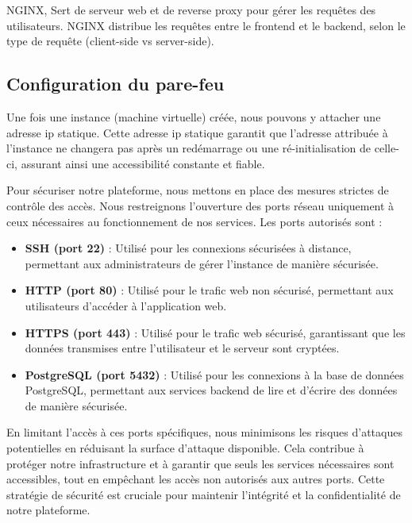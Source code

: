 NGINX, Sert de serveur web et de reverse proxy pour gérer les requêtes des utilisateurs. NGINX distribue les requêtes entre le frontend et le backend, selon le type de requête (client-side vs server-side).

\subsection{Configuration du pare-feu}

Une fois une instance (machine virtuelle) créée, nous pouvons y attacher une adresse \ac{ip} statique. Cette adresse \ac{ip} statique garantit que l'adresse attribuée à l'instance ne changera pas après un redémarrage ou une ré-initialisation de celle-ci, assurant ainsi une accessibilité constante et fiable.

Pour sécuriser notre plateforme, nous mettons en place des mesures strictes de contrôle des accès. Nous restreignons l'ouverture des ports réseau uniquement à ceux nécessaires au fonctionnement de nos services. Les ports autorisés sont :

\begin{itemize}
    \item \textbf{SSH (port 22)} : Utilisé pour les connexions sécurisées à distance, permettant aux administrateurs de gérer l'instance de manière sécurisée.
    
    \item \textbf{HTTP (port 80)} : Utilisé pour le trafic web non sécurisé, permettant aux utilisateurs d'accéder à l'application web.
    
    \item \textbf{HTTPS (port 443)} : Utilisé pour le trafic web sécurisé, garantissant que les données transmises entre l'utilisateur et le serveur sont cryptées.
    
    \item \textbf{PostgreSQL (port 5432)} : Utilisé pour les connexions à la base de données PostgreSQL, permettant aux services backend de lire et d'écrire des données de manière sécurisée.
\end{itemize}

En limitant l'accès à ces ports spécifiques, nous minimisons les risques d'attaques potentielles en réduisant la surface d'attaque disponible. Cela contribue à protéger notre infrastructure et à garantir que seuls les services nécessaires sont accessibles, tout en empêchant les accès non autorisés aux autres ports. Cette stratégie de sécurité est cruciale pour maintenir l'intégrité et la confidentialité de notre plateforme.


